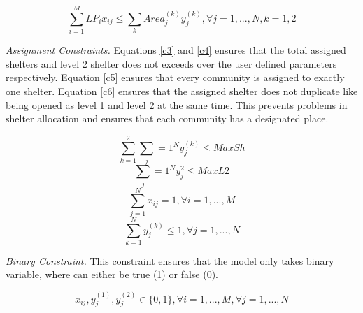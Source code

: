 	\begin{equation} 
		\label{c2}
		\sum_{i=1}^{M}LP_{i}x_{ij} \le \sum_{k} Area_{j}^{(k)} y_{j}^{(k)}, \forall j = 1,..., N , k=1,2
	\end{equation}
	
	\textit{Assignment Constraints.} Equations \ref{c3} and \ref{c4} ensures that the total assigned shelters and level 2 shelter does not exceeds over the user defined parameters respectively.  Equation \ref{c5} ensures that every community is assigned to exactly one shelter. Equation \ref{c6} ensures that the assigned shelter does not duplicate like being opened as level 1 and level 2 at the same time. This prevents problems in shelter allocation and ensures that each community has a designated place.
	
	\begin{equation} 
		\label{c3}
		\sum_{k=1}^{2} \sum_j={1}^{N}y_{j}^{(k)} \le MaxSh
	\end{equation}
	\begin{equation}
		\label{c4} 
		\sum_j={1}^{N}y_{j}^2 \le MaxL2
	\end{equation}
	\begin{equation}
		\label{c5}
		\sum_{j=1}^{N}x_{ij} = 1, \forall i=1,...,M
	\end{equation}
	\begin{equation}
		\label{c6}
		\sum_{k=1}^{N}y_{j}^{(k)} \le 1, \forall j=1,...,N
	\end{equation}
	
	\textit{Binary Constraint.} This constraint ensures that the model only takes binary variable, where can either be true (1) or false (0).
	
	\begin{equation}
		\label{c7}
	 	x_{ij}, y_{j}^{(1)},y_{j}^{(2)} \in \{0,1\}, \forall i=1,...,M,  \forall j=1,...,N
	\end{equation}
	
